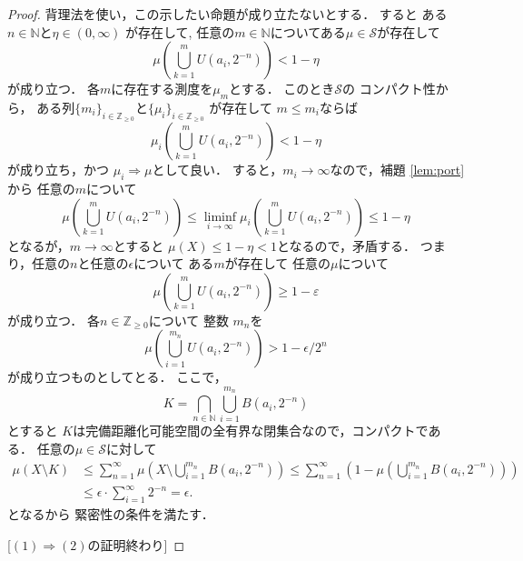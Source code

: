 \documentclass[leqno, a4paper, 12pt]{jsarticle}
\newcommand{\To}{\Longrightarrow}
\newcommand{\nn}{\mathbb{N}}
\newcommand{\zz}{\mathbb{Z}}
\newcommand{\ep}{\varepsilon}
\begin{document}
\begin{proof}
背理法を使い，この示したい命題が成り立たないとする．
すると
ある$n\in \nn$と$\eta\in (0, \infty)$
が存在して,
任意の$m\in \nn$についてある$\mu\in \mathcal{S}$が存在して
\[
\mu\left(\bigcup_{k=1}^mU(a_i, 2^{-n})\right)< 1-\eta
\]
が成り立つ．
各$m$に存在する測度を$\mu_m$とする．
このとき$\mathcal{S}$の
コンパクト性から，
ある列$\{m_i\}_{i\in \zz_{\ge 0}}$と$\{\mu_i\}_{i\in\zz_{\ge 0}}$
が存在して
$m\le m_i$ならば
\[
\mu_i\left(\bigcup_{k=1}^{m}U(a_i, 2^{-n})\right)< 1-\eta
\]
が成り立ち，かつ
$\mu_i\To \mu$として良い．
すると，$m_i\to \infty$なので，補題 \ref{lem:port}から
任意の$m$について
\[
	\mu\left(\bigcup_{k=1}^{m}U(a_i, 2^{-n})\right)
	\le 
	\liminf_{i\to \infty}\mu_{i}\left(\bigcup_{k=1}^{m}U(a_i, 2^{-n})\right)
	\le 1-\eta
\]
となるが，$m\to \infty$とすると
$\mu(X)\le 1-\eta<1$となるので，矛盾する．
つまり，任意の$n$と任意の$\epsilon$について
ある$m$が存在して
任意の$\mu$について
\[
\mu\left(\bigcup_{k=1}^{m}U(a_i, 2^{-n})\right)\ge 1-\ep
\]
が成り立つ．
各$n\in \zz_{\ge 0}$について
整数
$m_n$を
\[
\mu\left(\bigcup_{i=1}^{m_n}U(a_i, 2^{-n})\right)>1-\epsilon/2^n
\]
が成り立つものとしてとる．
ここで，
\[
K=\bigcap_{n\in \nn}\bigcup_{i=1}^{m_n}B(a_i, 2^{-n})
\]
とすると
$K$は完備距離化可能空間の全有界な閉集合なので，コンパクトである．
任意の$\mu\in \mathcal{S}$に対して
\begin{align*}
\mu(X\setminus K)
&\le 
\sum_{n=1}^{\infty}
\mu\left(X\setminus 
\bigcup_{i=1}^{m_n}B(a_i, 2^{-n})
\right)
\le 
\sum_{n=1}^{\infty}\left(1-\mu\left(
\bigcup_{i=1}^{m_n}B(a_i, 2^{-n})\right)
\right)\\
&\le \epsilon\cdot \sum_{i=1}^{\infty}2^{-n}
=\epsilon. 
\end{align*}
となるから
緊密性の条件を満たす．

[$(1)\To (2)$の証明終わり]
\end{proof}
\end{document}
